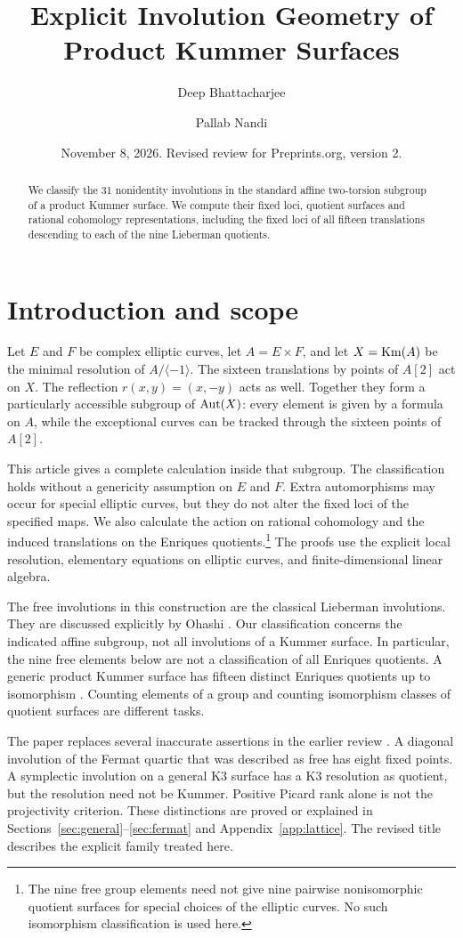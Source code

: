 \documentclass[11pt]{amsart}
\title[Involution geometry of product Kummer surfaces]{Explicit Involution Geometry of Product Kummer Surfaces}
\author{Deep Bhattacharjee}
\author{Pallab Nandi}
\date{November 8, 2026. Revised review for Preprints.org, version 2.}
\theoremstyle{definition}
\begin{document}
\begin{abstract}
We classify the 31 nonidentity involutions in the standard affine two-torsion subgroup of a product Kummer surface. We compute their fixed loci, quotient surfaces and rational cohomology representations, including the fixed loci of all fifteen translations descending to each of the nine Lieberman quotients.
\end{abstract}
\maketitle
\section{Introduction and scope}
Let $E$ and $F$ be complex elliptic curves, let $A=E\times F$, and let
$X=\operatorname{Km}(A)$ be the minimal resolution of $A/\langle-1\rangle$.
The sixteen translations by points of $A[2]$ act on $X$. The reflection
$r(x,y)=(x,-y)$ acts as well. Together they form a particularly accessible
subgroup of $\operatorname{Aut}(X)$: every element is given by a formula on $A$, while
the exceptional curves can be tracked through the sixteen points of $A[2]$.

This article gives a complete calculation inside that subgroup. The
classification holds without a genericity assumption on $E$ and $F$.
Extra automorphisms may occur for special elliptic curves, but they do not
alter the fixed loci of the specified maps. We also calculate the action
on rational cohomology and the induced translations on the Enriques
quotients.\footnote{The nine free group elements need not give nine
pairwise nonisomorphic quotient surfaces for special choices of the
elliptic curves. No such isomorphism classification is used here.}
The proofs use the explicit local resolution, elementary
equations on elliptic curves, and finite-dimensional linear algebra.

The free involutions in this construction are the classical Lieberman
involutions. They are discussed explicitly by Ohashi \cite{Ohashi}.
Our classification concerns the indicated affine subgroup, not all
involutions of a Kummer surface. In particular, the nine free elements
below are not a classification of all Enriques quotients. A generic
product Kummer surface has fifteen distinct Enriques quotients up to
isomorphism \cite{Ohashi}. Counting elements of a group and counting
isomorphism classes of quotient surfaces are different tasks.

The paper replaces several inaccurate assertions in the earlier review
\cite{Previous}. A diagonal involution of the Fermat quartic that was
described as free has eight fixed points. A symplectic involution on a
general K3 surface has a K3 resolution as quotient, but the resolution need
not be Kummer. Positive Picard rank alone is not the projectivity
criterion. These distinctions are proved or explained in
Sections~\ref{sec:general}--\ref{sec:fermat} and Appendix~\ref{app:lattice}.
The revised title describes the explicit family treated here.
\end{document}
